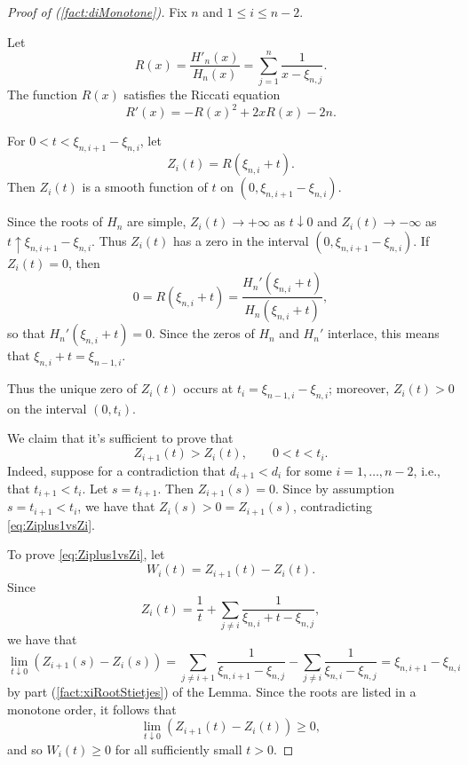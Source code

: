 \begin{proof}[Proof of (\ref{fact:diMonotone})]
    Fix $n$ and $1\leq i\leq n-2$. 

    Let $$R(x) = \frac{H'_n(x)}{H_n(x)} = \sum_{j=1}^n \frac{1}{x-\xi_{n,j}}.$$  The function $R(x)$ satisfies the Riccati equation \begin{equation}\label{eqn:RiccatiForR} R'(x) = -R(x)^2 + 2xR(x) - 2n.\end{equation}
    
    For $0<t< \xi_{n,i+1}-\xi_{n,i}$, let $$ Z_i(t) = R(\xi_{n,i} + t).$$
    Then $Z_i(t)$ is a smooth function of $t$ on $(0,\xi_{n,i+1}-\xi_{n,i})$.  
    
    Since the roots of $H_n$ are simple,  $Z_i(t)\to +\infty$ as $t\downarrow 0$ and $Z_i(t)\to -\infty$ as $t\uparrow \xi_{n,i+1}-\xi_{n,i}$. Thus $Z_i(t)$ has a zero in the interval $(0,\xi_{n,i+1}-\xi_{n,i})$.  If $Z_i(t)=0$, then $$ 0 = R(\xi_{n,i}+t)= \frac{H_n'(\xi_{n,i}+t)}{H_n(\xi_{n,i}+t)},$$ so that $H_n'(\xi_{n,i}+t)=0$. Since the zeros of $H_n$ and $H_n'$ interlace, this means that $\xi_{n,i}+t=\xi_{n-1,i}$. 
    
    Thus the unique zero of $Z_i(t)$ occurs at $t_i = \xi_{n-1,i} - \xi_{n,i}$; moreover, $Z_i(t)>0$ on the interval $(0,t_i)$. 

    We claim that it's sufficient to prove that
    \begin{equation}
        \label{eq:Ziplus1vsZi}
        Z_{i+1}(t)>Z_i(t),\qquad 0<t<t_i. 
    \end{equation}
    Indeed, suppose for a contradiction that $d_{i+1} < d_i$ for some $i=1,\dots,n-2$, i.e., that $t_{i+1}<t_i$.  Let $s=t_{i+1}$.  Then $Z_{i+1}(s)=0$. Since by assumption $s= t_{i+1}< t_i$, we have that $Z_{i}(s)>0 = Z_{i+1}(s)$, contradicting \eqref{eq:Ziplus1vsZi}.

    To prove \eqref{eq:Ziplus1vsZi}, let $$W_i(t) = Z_{i+1}(t) - Z_i(t).$$  Since $$Z_i(t) = \frac{1}{t} + \sum_{j\neq i} \frac{1}{\xi_{n,i} + t - \xi_{n,j} },$$ we have that $$\lim_{t\downarrow 0} \left(Z_{i+1}(s) - Z_i(s)\right)
    = \sum_{j\neq i+1} \frac{1}{\xi_{n,i+1} - \xi_{n,j}} - \sum_{j\neq i} \frac{1}{\xi_{n,i} - \xi_{n,j}}  
    = \xi_{n,i+1}-\xi_{n,i}$$ by part (\ref{fact:xiRootStietjes}) of the Lemma. Since the roots are listed in a monotone order, it follows that $$\lim_{t\downarrow 0} \left(Z_{i+1}(t) - Z_i(t)\right) \geq 0,$$ and so $W_i(t)\geq 0$ for all sufficiently small $t>0$.


\end{proof}
